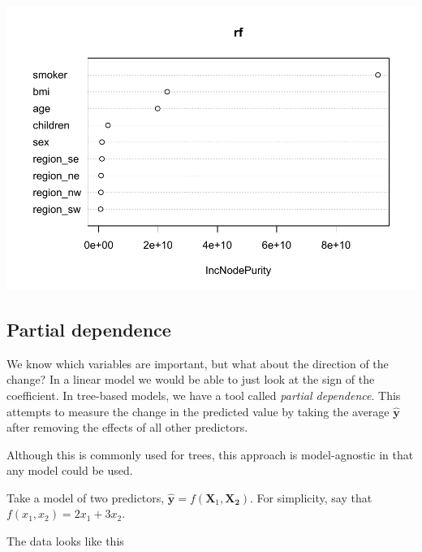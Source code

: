 \documentclass[openany]{book}
\newenvironment{Shaded}{\begin{snugshade}}{\end{snugshade}}
\newcommand{\DataTypeTok}[1]{\textcolor[rgb]{0.13,0.29,0.53}{#1}}
\newcommand{\DecValTok}[1]{\textcolor[rgb]{0.00,0.00,0.81}{#1}}
\newcommand{\KeywordTok}[1]{\textcolor[rgb]{0.13,0.29,0.53}{\textbf{#1}}}
\newcommand{\NormalTok}[1]{#1}
\newcommand{\OperatorTok}[1]{\textcolor[rgb]{0.81,0.36,0.00}{\textbf{#1}}}
\newcommand{\StringTok}[1]{\textcolor[rgb]{0.31,0.60,0.02}{#1}}
\begin{document}
\includegraphics{06-tree-based-models_files/figure-latex/unnamed-chunk-16-1.pdf}

\hypertarget{partial-dependence}{%
\subsection{Partial dependence}\label{partial-dependence}}

We know which variables are important, but what about the direction of the change? In a linear model we would be able to just look at the sign of the coefficient. In tree-based models, we have a tool called \emph{partial dependence}. This attempts to measure the change in the predicted value by taking the average \(\hat{\mathbf{y}}\) after removing the effects of all other predictors.

Although this is commonly used for trees, this approach is model-agnostic in that any model could be used.

Take a model of two predictors, \(\hat{\mathbf{y}} = f(\mathbf{X}_1, \mathbf{X_2})\). For simplicity, say that \(f(x_1, x_2) = 2x_1 + 3x_2\).

The data looks like this

\begin{Shaded}
\end{Shaded}
\end{document}
